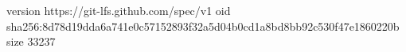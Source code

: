 version https://git-lfs.github.com/spec/v1
oid sha256:8d78d19dda6a741e0c57152893f32a5d04b0cd1a8bd8bb92c530f47e1860220b
size 33237
